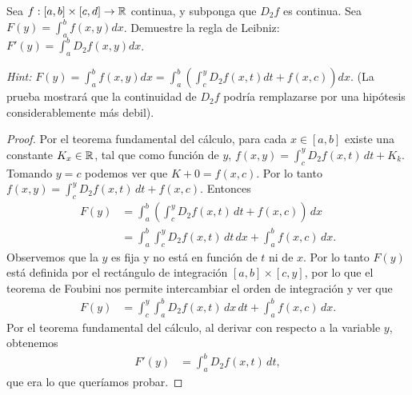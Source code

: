 Sea \( f:[a,b]\times [ c,d ] \to \mathbb{R} \) continua, y subponga que 
\( D_2f \) es continua. Sea \( F(y) = \int_a^b f(x,y)dx \). Demuestre la
regla de Leibniz: \( F'(y) = \int_a^b D_2 f(x,y)dx \). 

\textit{Hint:} 
\( F(y) = \int_a^b f(x,y)dx = \int_a^b \left( \int_c^y D_2f ( x,t ) dt
+ f(x,c)\right) dx \). (La prueba mostrará que la continuidad de 
\( D_2f \) podría remplazarse por una hipótesis considerablemente más debil).
\begin{proof}
    Por el teorema fundamental del cálculo, para cada $x\in[a,b]$ 
    existe una constante \( K_x\in\mathbb{R} \),
    tal que como función de $y$, \( f(x,y) = \int_c^y D_2f(x,t)\,dt + K_k \). Tomando $y=c$
    podemos ver que $K+0=f(x,c)$. Por lo tanto 
    \( f(x,y)=\int_c^y D_2f(x,t)\,dt + f(x,c) \).
    Entonces
    \begin{align*}
        F(y)
        &=
        \int_a^b
        \left( 
            \int_c^y
            D_2f(x,t)\, dt
            +f(x,c)
        \right) \,dx\\
        &=
        \int_a^b
            \int_c^y
            D_2f(x,t)
            \, dt
        \, dx
        +
        \int_a^b
            f(x,c)
        \,dx.
    \end{align*}
    Observemos que la $y$ es fija y no está en función de $t$ ni de $x$. Por lo tanto 
    $F(y)$ está definida por el rectángulo de integración \( [ a,b ] \times [ c,y ] \), por
    lo que el teorema de Foubini nos permite intercambiar el orden de integración y ver que 
    \begin{align*}
        F(y)
        &=
        \int_c^y
            \int_a^b
            D_2f(x,t)
            \, dx
        \,dt
        +
        \int_a^b
        f(x,c)
        \,dx.
    \end{align*}
    Por el teorema fundamental del cálculo, al derivar con respecto a la variable $y$, obtenemos
    \begin{align*}
        F'(y)
        &=
        \int_a^b D_2f(x,t)\,dt,
    \end{align*}
    que era lo que queríamos probar.
\end{proof}
